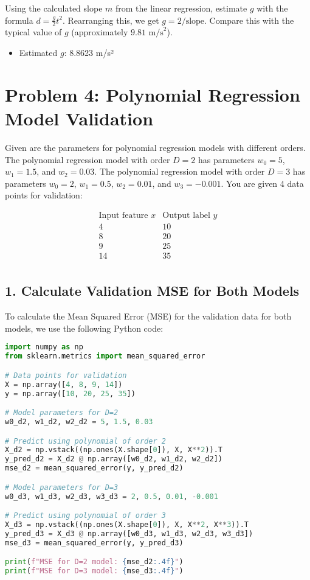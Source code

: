 \documentclass[a4paper,10pt]{article}
\begin{document}
Using the calculated slope \( m \) from the linear regression, estimate \( g \) with the formula \( d = \frac{g}{2} t^2 \). Rearranging this, we get \( g = 2 / \text{slope} \). Compare this with the typical value of \( g \) (approximately \( 9.81 \text{ m/s}^2 \)).

\begin{itemize}
    \item Estimated \( g \): 8.8623 m/s² 
\end{itemize}

\newpage
\section*{Problem 4: Polynomial Regression Model Validation}

Given are the parameters for polynomial regression models with different orders. The polynomial regression model with order \( D=2 \) has parameters \( w_0=5 \), \( w_1=1.5 \), and \( w_2=0.03 \). The polynomial regression model with order \( D=3 \) has parameters \( w_0=2 \), \( w_1=0.5 \), \( w_2=0.01 \), and \( w_3=-0.001 \). You are given 4 data points for validation:

\[
\begin{array}{cc}
\text{Input feature } x & \text{Output label } y \\
4 & 10 \\
8 & 20 \\
9 & 25 \\
14 & 35 \\
\end{array}
\]

\subsection*{1. Calculate Validation MSE for Both Models}

To calculate the Mean Squared Error (MSE) for the validation data for both models, we use the following Python code:

\begin{lstlisting}[language=Python, caption=Python Code for Linear Regression and MSE Calculation]
import numpy as np
from sklearn.metrics import mean_squared_error

# Data points for validation
X = np.array([4, 8, 9, 14])
y = np.array([10, 20, 25, 35])

# Model parameters for D=2
w0_d2, w1_d2, w2_d2 = 5, 1.5, 0.03

# Predict using polynomial of order 2
X_d2 = np.vstack((np.ones(X.shape[0]), X, X**2)).T
y_pred_d2 = X_d2 @ np.array([w0_d2, w1_d2, w2_d2])
mse_d2 = mean_squared_error(y, y_pred_d2)

# Model parameters for D=3
w0_d3, w1_d3, w2_d3, w3_d3 = 2, 0.5, 0.01, -0.001

# Predict using polynomial of order 3
X_d3 = np.vstack((np.ones(X.shape[0]), X, X**2, X**3)).T
y_pred_d3 = X_d3 @ np.array([w0_d3, w1_d3, w2_d3, w3_d3])
mse_d3 = mean_squared_error(y, y_pred_d3)

print(f"MSE for D=2 model: {mse_d2:.4f}")
print(f"MSE for D=3 model: {mse_d3:.4f}")
\end{lstlisting}
\end{document}
